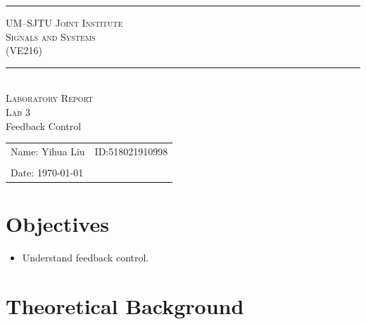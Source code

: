 \documentclass[a4paper]{article}
\begin{document}
\begin{titlepage}
	\begin{Large}
		\begin{center}
			\noindent\rule[0.25\baselineskip]{\textwidth}{1pt}
			\vspace{0.5cm}
			\textsc{UM--SJTU Joint Institute}\\
			\vspace{0.25cm}
			\textsc{Signals and Systems\\(VE216)}
			\noindent\rule[0.25\baselineskip]{\textwidth}{1pt}
			\vspace{4.9cm}\\
			\textsc{Laboratory Report}\\
			\vspace{0.85cm}
			\textsc{Lab 3}\\
			\vspace{0.5em}
			Feedback Control
			\vspace{6cm}
		\end{center}
	\end{Large}
	\begin{tabular}{ll}
		Name: Yihua Liu&ID:518021910998\\
		&\\
		Date: \today&\\
	\end{tabular}
\end{titlepage}
\newpage
\renewcommand\thesection{\arabic{section}}
\section{Objectives}
\begin{itemize}
    \item Understand feedback control.
\end{itemize}
\section{Theoretical Background}
\end{document}
